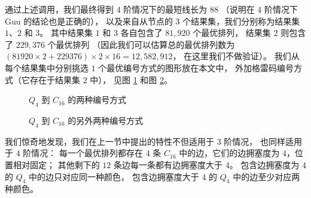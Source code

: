 通过上述调用，我们最终得到 $4$ 阶情况下的最短线长为 $88$
（说明在 $4$ 阶情况下 Guu 的结论也是正确的），
以及来自从节点的 $3$ 个结果集，我们分别称为结果集 $1$、$2$ 和 $3$。
其中结果集 $1$ 和 $3$ 各自包含了 $81,920$ 个最优排列，
结果集 $2$ 则包含了 $229,376$ 个最优排列
（因此我们可以估算总的最优排列数为 $(81920 \times 2 + 229376) \times 2 \times 16 = 12,582,912$，
在这里我们不做验证）。
我们从每个结果集中分别挑选 $1$ 个最优编号方式的图形放在本文中，
外加格雷码编号方式（它存在于结果集 $2$ 中），
见图 \ref{Figure 5-2} 和图 \ref{Figure 5-3}。

\begin{figure}[h!]
	\centering
	\caption{$Q_4$ 到 $C_{16}$ 的两种编号方式}
	\label{Figure 5-2}
\end{figure}

\begin{figure}[h!]
	\centering
	\caption{$Q_4$ 到 $C_{16}$ 的另外两种编号方式}
	\label{Figure 5-3}
\end{figure}

我们惊奇地发现，我们在上一节中提出的特性不但适用于 $3$ 阶情况，
也同样适用于 $4$ 阶情况：
每一个最优排列都存在 $4$ 条 $C_{16}$ 中的边，它们的边拥塞度为 $4$，位置相对固定；
其他剩下的 $12$ 条边每一条都有边拥塞度大于 $4$。
包含边拥塞度为 $4$ 的 $Q_4$ 中的边只对应同一种颜色，
包含边拥塞度大于 $4$ 的 $Q_4$ 中的边至少对应两种颜色。

